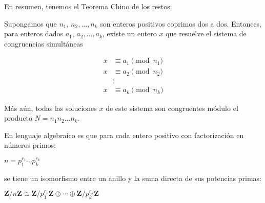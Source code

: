 \documentclass[10pt,a4paper]{article}
\begin{document}
	\hfill 

 	En resumen, tenemos el Teorema Chino de los restos:
 	
 	\hfil 
 	
 	Supongamos que $n_1,\, n_2, …, n_k$
 	son enteros positivos coprimos dos a dos. Entonces, para enteros dados $a_1,\, a_2, …, a_k$, existe un
 	entero $x$ que resuelve el sistema de congruencias simultáneas
 	
 	\begin{align*}
 	x &\equiv a_1 \pmod{n_1} \\
 	x &\equiv a_2 \pmod{n_2} \\
 	&\vdots \\
 	x &\equiv a_k \pmod{n_k}
 	\end{align*}
 	
 	Más aún, todas las soluciones $x$ de este sistema son congruentes módulo el
 	producto $N = n_1 n_2 ... n_k$.
 	 	
 	En lenguaje algebraico es que para cada entero positivo con factorización en números primos:
 	
 	$n = p_1^{r_1}\cdots p_k^{r_k}$
 	
 	se tiene un isomorfismo entre un anillo y la suma directa de sus potencias primas:
 	
	$\mathbf{Z}/n\mathbf{Z} \cong \mathbf{Z}/p_1^{r_1}\mathbf{Z} \oplus \cdots \oplus \mathbf{Z}/p_k^{r_k}\mathbf{Z}$
 	
	
\end{document}
